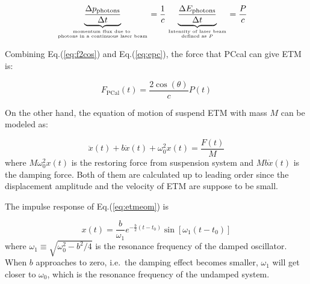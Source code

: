 \begin{align}
\label{eq:epc}
   \underbrace{\frac{\Delta p_{\text{photons}}}{\Delta t}}_{\text{momentum flux due to }\atop \text{photons in a continuous laser beam}}
   &= \frac{1}{c}
   \underbrace{ \frac{\Delta E_{\text{photons}}}{\Delta t} }_{\text{Intensity of laser beam}\atop \text{defined as } P}
   = \frac{P}{c} 
\end{align}

Combining Eq.(\ref{eq:f2cos}) and Eq.(\ref{eq:epc}), the force that PCcal can give ETM is:

\begin{equation}
\label{eq:pcalforce}
    F_\text{PCal}(t) = \frac{ 2 \cos(\theta) }{c} P(t) 
\end{equation}


On the other hand, the equation of motion of suspend ETM with mass $M$ can be modeled as:

\begin{equation}
\label{eq:etmeom}
    \ddot{x}(t) + b \dot{x}(t) + \omega_0^2 x(t) = \frac{F(t)}{M} 
\end{equation}
where $M \omega_0^2 x(t)$ is the restoring force from suspension system and $M b\dot{x}(t)$ is the damping force. Both of them are calculated up to leading order since the displacement amplitude and the velocity of ETM are suppose to be small. 


%


The impulse response of Eq.(\ref{eq:etmeom}) is

\begin{equation}
    x(t)=\frac{b}{\omega_1}e^{-\frac{b}{2}(t-t_0)}\sin[\omega_1 (t-t_0)]
\end{equation}
where $\omega_1 \equiv \sqrt{\omega_0^2 - b^2/4}$ is the resonance frequency of the damped oscillator. When $b$ approaches to zero, i.e.~the damping effect becomes smaller, $\omega_1$ will get closer to $\omega_0$, which is the resonance frequency of the undamped system.


